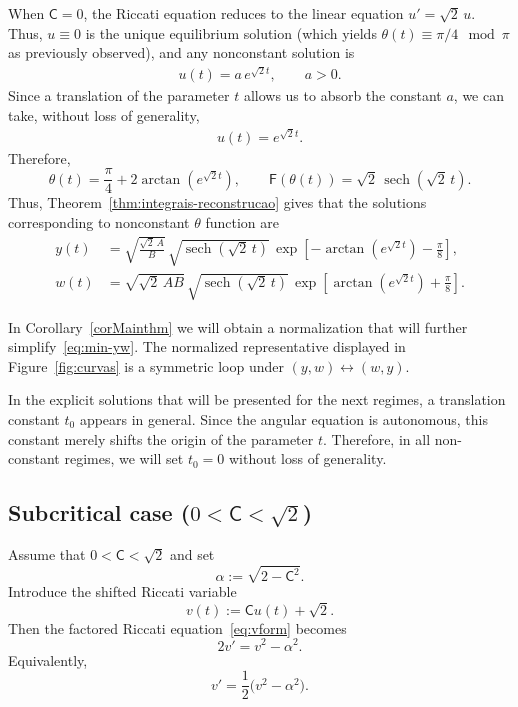 \documentclass[11pt,a4paper]{amsart}
\theoremstyle{plain}
\theoremstyle{remark}
\newcommand{\C}{\mathsf{C}}
\newcommand{\F}{\mathsf{F}}
\DeclareMathOperator{\sech}{sech}
\begin{document}
When $\C=0$, the Riccati equation 
reduces to the linear equation
$u'=\sqrt2\,u$. Thus, $u\equiv 0$ is the unique equilibrium solution 
(which yields $\theta(t)\equiv \pi/4 \mod \pi$ as previously observed), and
any nonconstant solution is
\begin{align*}
u(t)=a\,e^{\sqrt2 t}, \qquad a>0.
\end{align*}
Since a translation of the parameter $t$ allows us to absorb the constant 
$a$, we can take, without loss of generality,
\begin{align*}
u(t)=e^{\sqrt2 t}.
\end{align*}
Therefore,
\begin{equation}\label{eq:min-theta}
\theta(t)=\frac\pi4+2\arctan(e^{\sqrt2 t}),
\qquad
\F(\theta(t))=\sqrt2\,\sech(\sqrt2\,t).
\end{equation}
Thus, Theorem~\ref{thm:integrais-reconstrucao} gives that the 
solutions corresponding to nonconstant $\theta$ function are
\begin{equation}\label{eq:min-yw}
\boxed{\;
\begin{aligned}
y(t)
&=
\sqrt{\frac{\sqrt2\,A}{B}}\,
\sqrt{\sech(\sqrt2\,t)}\,
\exp\!\left[
-\arctan(e^{\sqrt2 t})-\frac{\pi}{8}
\right],
\\[2pt]
w(t)
&=
\sqrt{\sqrt2\,AB}\,
\sqrt{\sech(\sqrt2\,t)}\,
\exp\!\left[
\arctan(e^{\sqrt2 t})+\frac{\pi}{8}
\right].
\end{aligned}
\;}
\end{equation}

 In Corollary~\ref{corMainthm} we
will obtain a normalization that will further
simplify~\eqref{eq:min-yw}. The normalized representative displayed in Figure~\ref{fig:curvas} is a
symmetric loop under $(y,w)\leftrightarrow(w,y)$.


In the explicit solutions that will be presented for the next regimes, 
a translation constant $t_0$ appears in 
general. Since the angular equation is autonomous, this constant merely 
shifts the origin of the parameter $t$. Therefore, in all non-constant 
regimes, we will set $t_0=0$ without loss of generality.

\subsection[Subcritical case]{Subcritical case ($0<\C<\sqrt{2}$)}
\label{subsec:subcritico}

Assume that $0<\C<\sqrt{2}$ and set
\[
\alpha:=\sqrt{2-\C^{2}}.
\]
Introduce the shifted Riccati variable
\[
v(t):=\C u(t)+\sqrt{2}.
\]
Then the factored Riccati equation~\eqref{eq:vform} becomes
\begin{equation}\label{eq:sub-vform}
2v'=v^{2}-\alpha^{2}.
\end{equation}
Equivalently,
\begin{equation}\label{eq:sub-vform-half}
v'=\frac{1}{2}\bigl(v^{2}-\alpha^{2}\bigr).
\end{equation}
\end{document}

